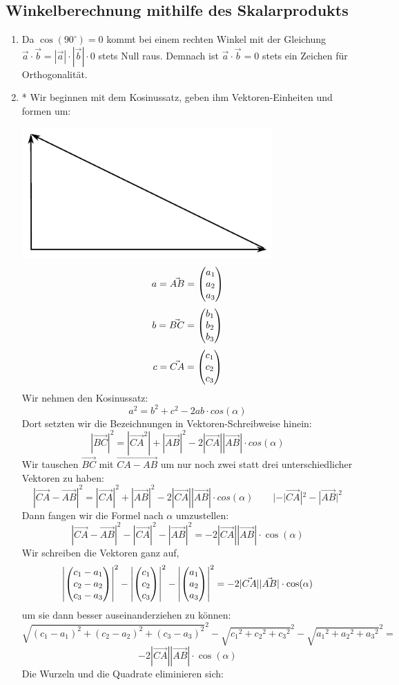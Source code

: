 \subsection{Winkelberechnung mithilfe des Skalarprodukts}
	\begin{enumerate}
		\item Da $\cos(90^\circ)=0$ kommt bei einem rechten Winkel mit der Gleichung $\vec{a}\cdot\vec{b}=|\vec{a}|\cdot|\vec{b}|\cdot0 $ stets Null raus. Demnach ist $\vec{a}\cdot\vec{b} = 0$ stets ein Zeichen für Orthogonalität.

		\item * Wir beginnen mit dem Kosinussatz, geben ihm Vektoren-Einheiten und formen um:
		
		{\includegraphics [keepaspectratio,height=5cm]{pics/Dreieck}}
		$$a=\vec{AB}=\begin{pmatrix} a_1 \\ a_2 \\ a_3 \end{pmatrix}$$			$$b=\vec{BC}=\begin{pmatrix} b_1 \\ b_2 \\ b_3 \end{pmatrix}$$
		$$c=\vec{CA}=\begin{pmatrix} c_1 \\ c_2 \\ c_3 \end{pmatrix}$$\newline\newline
Wir nehmen den Kosinussatz:				
		$$ a^2=b^2+c^2-2ab\cdot cos(\alpha)$$
Dort setzten wir die Bezeichnungen in Vektoren-Schreibweise hinein:	
		$$ |\vec{BC}|^2=|\vec{CA}^2|+|\vec{AB}|^2-2|\vec{CA}||\vec{AB}|\cdot cos(\alpha) $$
Wir tauschen $\vec{BC}$ mit $\vec{CA-AB}$ um nur noch zwei statt drei unterschiedlicher Vektoren zu haben:	
		$$|\vec{CA}-\vec{AB}|^2=|\vec{CA}|^2+|\vec{AB}|^2-2|\vec{CA}||\vec{AB}|\cdot cos(\alpha) \qquad |-|\vec{CA}|^2-|\vec{AB}|^2 $$
Dann fangen wir die Formel nach $\alpha$ umzustellen:	
		$$|\vec{CA}-\vec{AB}|^2-|\vec{CA}|^2-|\vec{AB}|^2=-2|\vec{CA}||\vec{AB}|\cdot \cos(\alpha) $$
Wir schreiben die Vektoren ganz auf,	
		$$\left|\begin{pmatrix} c_1-a_1 \\ c_2-a_2 \\ c_3-a_3 \end{pmatrix}\right|^2-\left|\begin{pmatrix} c_1 \\ c_2 \\ c_3 \end{pmatrix}\right|^2-\left|\begin{pmatrix} a_1 \\ a_2 \\ a_3 \end{pmatrix}\right|^2=-2|\vec{CA}||\vec{AB}| \cdot \cos(\alpha) $$
um sie dann besser auseinanderziehen zu können:	
		$$\sqrt{(c_1-a_1)^2+(c_2-a_2)^2+(c_3-a_3)^2}^2-\sqrt{{c_1}^2+{c_2}^2+{c_3}^2}^2-\sqrt{{a_1}^2+{a_2}^2+{a_3}^2}^2=$$
		$$-2|\vec{CA}||\vec{AB}|\cdot \cos(\alpha) $$
Die Wurzeln und die Quadrate eliminieren sich:	

\end{enumerate}
